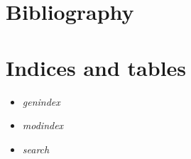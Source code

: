 \documentclass[letterpaper,10pt,english]{sphinxmanual}
\begin{document}
\chapter{Bibliography}
\label{bibliography:bibliography}\label{bibliography::doc}

\chapter{Indices and tables}
\label{master_doc:indices-and-tables}\begin{itemize}
\item {} 
\emph{genindex}

\item {} 
\emph{modindex}

\item {} 
\emph{search}

\end{itemize}



\renewcommand{\indexname}{Index}
\printindex
\end{document}
